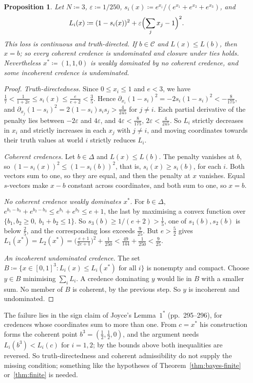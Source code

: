 \documentclass[11pt]{article}
\newtheorem{proposition}[theorem]{Proposition}
\theoremstyle{definition}
\theoremstyle{remark}
\newcommand{\C}{\mathcal C}
\begin{document}
\begin{proposition}\label{prop:joyce}
Let $N\coloneqq3$, $\varepsilon\coloneqq1/250$, $s_i(x)\coloneqq e^{x_i}/(e^{x_1}+e^{x_2}+e^{x_3})$, and
\[
L_i(x)\coloneqq(1-s_i(x))^2+\varepsilon\Bigl(\sum_jx_j-1\Bigr)^2.
\]
This loss is continuous and truth-directed. If $b\in\C$ and $L(x)\le L(b)$, then $x=b$; so every coherent credence is undominated and closure under ties holds. Nevertheless $x^*\coloneqq(1,1,0)$ is weakly dominated by no coherent credence, and some incoherent credence is undominated.
\end{proposition}
\begin{proof}
\emph{Truth-directedness.} Since $0\le x_i\le1$ and $e<3$, we have $\frac17<\frac1{1+2e}\le s_i(x)\le\frac e{e+2}<\frac35$. Hence $\partial_{x_i}(1-s_i)^2=-2s_i(1-s_i)^2<-\frac8{175}$, and $\partial_{x_j}(1-s_i)^2=2(1-s_i)s_is_j>\frac4{245}$ for $j\ne i$. Each partial derivative of the penalty lies between $-2\varepsilon$ and $4\varepsilon$, and $4\varepsilon<\frac8{175}$, $2\varepsilon<\frac4{245}$. So $L_i$ strictly decreases in $x_i$ and strictly increases in each $x_j$ with $j\ne i$, and moving coordinates towards their truth values at world $i$ strictly reduces $L_i$.

\emph{Coherent credences.} Let $b\in\Delta$ and $L(x)\le L(b)$. The penalty vanishes at $b$, so $(1-s_i(x))^2\le(1-s_i(b))^2$, that is, $s_i(x)\ge s_i(b)$, for each $i$. Both vectors sum to one, so they are equal, and then the penalty at $x$ vanishes. Equal $s$-vectors make $x-b$ constant across coordinates, and both sum to one, so $x=b$.

\emph{No coherent credence weakly dominates $x^*$.} For $b\in\Delta$, $e^{b_1-b_3}+e^{b_2-b_3}\le e^{b_1}+e^{b_2}\le e+1$, the last by maximising a convex function over $\{b_1,b_2\ge0,\ b_1+b_2\le1\}$. So $s_3(b)\ge1/(e+2)>\frac15$, one of $s_1(b),s_2(b)$ is below $\frac25$, and the corresponding loss exceeds $\frac9{25}$. But $e>\frac52$ gives $L_1(x^*)=L_2(x^*)=\bigl(\frac{e+1}{2e+1}\bigr)^2+\frac1{250}<\frac{49}{144}+\frac1{250}<\frac9{25}$.

\emph{An incoherent undominated credence.} The set $B\coloneqq\{x\in[0,1]^3:L_i(x)\le L_i(x^*)\text{ for all }i\}$ is nonempty and compact. Choose $y\in B$ minimising $\sum_iL_i$. A credence dominating $y$ would lie in $B$ with a smaller sum. No member of $B$ is coherent, by the previous step. So $y$ is incoherent and undominated.
\end{proof}

The failure lies in the sign claim of Joyce's Lemma~$1^*$ (pp.~295--296), for credences whose coordinates sum to more than one. From $c=x^*$ his construction forms the coherent point $b^3=(\frac12,\frac12,0)$, and the argument needs $L_i(b^3)<L_i(c)$ for $i=1,2$; by the bounds above both inequalities are reversed. So truth-directedness and coherent admissibility do not supply the missing condition; something like the hypotheses of Theorem~\ref{thm:bayes-finite} or~\ref{thm:finite} is needed.
\end{document}

